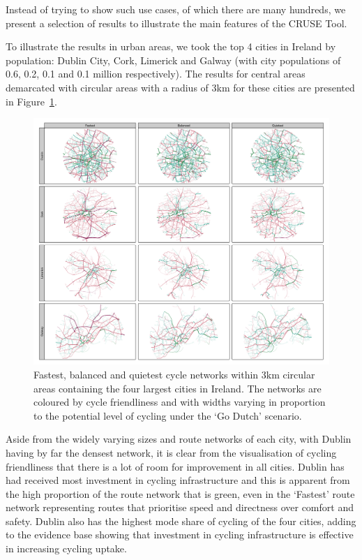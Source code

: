\documentclass[
  super,
  preprint,
  3p]{elsarticle}
\begin{document}
Instead of trying to show such use cases, of which there are many
hundreds, we present a selection of results to illustrate the main
features of the CRUSE Tool.

To illustrate the results in urban areas, we took the top 4 cities in
Ireland by population: Dublin City, Cork, Limerick and Galway (with city
populations of 0.6, 0.2, 0.1 and 0.1 million respectively). The results
for central areas demarcated with circular areas with a radius of 3km
for these cities are presented in Figure~\ref{fig-city-results}.

\begin{figure}

{\centering 

\includegraphics{images/rnet_types.png}

}

\caption{\label{fig-city-results}Fastest, balanced and quietest cycle
networks within 3km circular areas containing the four largest cities in
Ireland. The networks are coloured by cycle friendliness and with widths
varying in proportion to the potential level of cycling under the `Go
Dutch' scenario.}

\end{figure}

Aside from the widely varying sizes and route networks of each city,
with Dublin having by far the densest network, it is clear from the
visualisation of cycling friendliness that there is a lot of room for
improvement in all cities. Dublin has had received most investment in
cycling infrastructure and this is apparent from the high proportion of
the route network that is green, even in the `Fastest' route network
representing routes that prioritise speed and directness over comfort
and safety. Dublin also has the highest mode share of cycling of the
four cities, adding to the evidence base showing that investment in
cycling infrastructure is effective in increasing cycling uptake.
\end{document}
